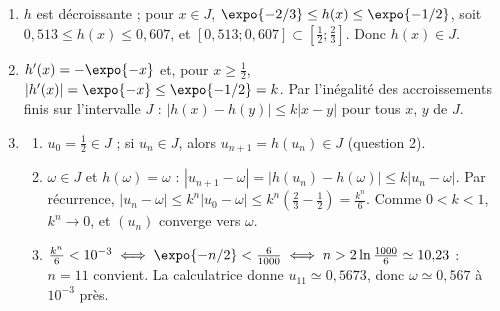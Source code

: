 \begin{corrige}
\begin{sol}
\begin{enumerate}
\item $h$ est d\'ecroissante ; pour $x \in J$, $\expo{-2/3} \leq h(x) \leq \expo{-1/2}$, soit $0{,}513 \leq h(x) \leq 0{,}607$, et
      $[0{,}513 ; 0{,}607] \subset \left[\frac{1}{2};\frac{2}{3}\right]$. Donc $h(x) \in J$.
\item $h'(x) = -\expo{-x}$ et, pour $x \geq \frac{1}{2}$, $|h'(x)| = \expo{-x} \leq \expo{-1/2} = k$.
      Par l'in\'egalit\'e des accroissements finis sur l'intervalle $J$ : $|h(x) - h(y)| \leq k|x - y|$ pour tous $x$, $y$ de $J$.
\item \begin{enumerate}
      \item $u_0 = \frac{1}{2} \in J$ ; si $u_n \in J$, alors $u_{n+1} = h(u_n) \in J$ (question 2).
      \item $\omega \in J$ et $h(\omega) = \omega$ : $|u_{n+1} - \omega| = |h(u_n) - h(\omega)| \leq k|u_n - \omega|$.
            Par r\'ecurrence, $|u_n - \omega| \leq k^n|u_0 - \omega| \leq k^n\left(\frac{2}{3} - \frac{1}{2}\right) = \frac{k^n}{6}$.
            Comme $0 < k < 1$, $k^n \to 0$, et $(u_n)$ converge vers $\omega$.
      \item $\frac{k^n}{6} < 10^{-3} \iff \expo{-n/2} < \frac{6}{1000} \iff n > 2\ln\frac{1000}{6} \simeq 10{,}23$ : $n = 11$ convient.
            La calculatrice donne $u_{11} \simeq 0{,}5673$, donc $\boxed{\omega \simeq 0{,}567}$ \`a $10^{-3}$ pr\`es.
      \end{enumerate}
\end{enumerate}
\end{sol}


\end{corrige}
